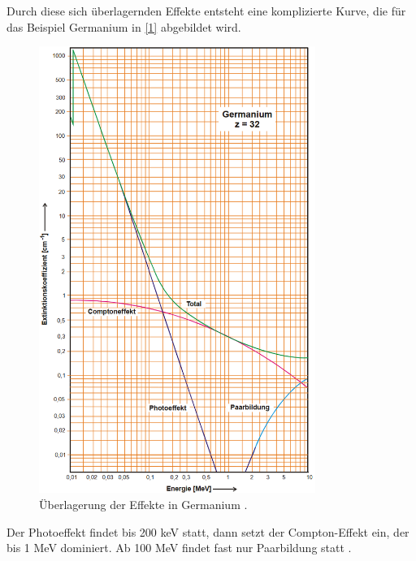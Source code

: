 Durch diese sich überlagernden Effekte entsteht eine komplizierte Kurve, die für das Beispiel Germanium in \autoref{1} abgebildet wird. 
\begin{figure}[H]
    \centering
    \includegraphics[width = 9cm]{content/1}
    \caption{Überlagerung der Effekte in Germanium \cite{sample}.}
    \label{1}
\end{figure}
Der Photoeffekt findet bis 200 keV statt, dann setzt der Compton-Effekt ein, der bis 1 MeV dominiert. Ab 100 MeV findet fast nur Paarbildung statt \cite{sample}. 

